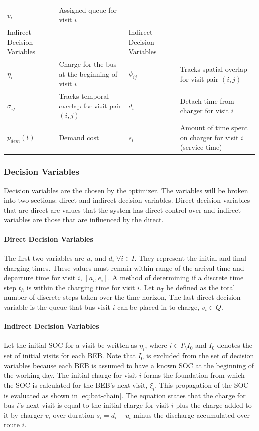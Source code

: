 \documentclass[11pt,a4paper,final]{article}
\newcommand{\Iset}{I}                       %
\newcommand{\Qset}{Q}                       %
\begin{document}
\begin{table}[htbp]
\begin{tabularx}{\textwidth}{L{0.3} L{1.2} L{0.3} L{1.2}}
\(v_i\) & Assigned queue for visit \(i\) &  & \\[0pt]
Indirect Decision Variables &  & Indirect Decision Variables & \\[0pt]
\(\eta_i\) & Charge for the bus at the beginning of visit \(i\) & \(\psi_{ij}\) & Tracks spatial overlap for visit pair \((i,j)\)\\[0pt]
\(\sigma_{ij}\) & Tracks temporal overlap for visit pair \((i,j)\) & \(d_i\) & Detach time from charger for visit \(i\)\\[0pt]
\(p_{dem}(t)\) & Demand cost & \(s_i\) & Amount of time spent on charger for visit \(i\) (service time)\\[0pt]
\hline
\end{tabularx}
\end{table}

\subsubsection{Decision Variables}
\label{sec:decision-variables}
Decision variables are the chosen by the optimizer. The variables will be broken into two sections: direct and indirect
decision variables. Direct decision variables that are direct are values that the system has direct control over and
indirect variables are those that are influenced by the direct.

\paragraph{Direct Decision Variables}
\label{sec:direct-decision-variables}
The first two variables are \(u_i\) and \(d_i \; \forall i \in \Iset\). They represent the initial and final charging times. These
values must remain within range of the arrival time and departure time for visit \(i\), \([a_i, e_i]\). A method of
determining if a discrete time step \(t_h\) is within the charging time for visit \(i\). Let \(n_T\) be defined as the total
number of discrete steps taken over the time horizon, The last direct decision variable is the queue that
bus visit \(i\) can be placed in to charge, \(v_i \in \Qset\).

\paragraph{Indirect Decision Variables}
\label{sec:indirect-decision-variables}
Let the initial SOC for a visit be written as \(\eta_i\), where \(i \in \Iset \setminus \Iset_0\) and \(\Iset_0\) denotes the set of
initial visits for each BEB. Note that \(\Iset_0\) is excluded from the set of decision variables because each BEB is
assumed to have a known SOC at the beginning of the working day. The initial charge for visit \(i\) forms the foundation
from which the SOC is calculated for the BEB's next visit, \(\xi_i\). This propagation of the SOC is evaluated as shown in
\ref{eq:bat-chain}. The equation states that the charge for bus \(i\)'s next visit is equal to the initial charge for visit \(i\)
plus the charge added to it by charger \(v_i\) over duration \(s_i = d_i - u_i\) minus the discharge accumulated over route
\(i\).
\end{document}
